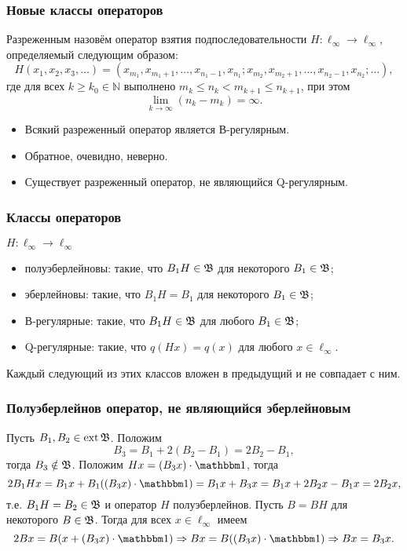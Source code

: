 \begin{frame}\frametitle{{Новые классы операторов}}
	\vfill
	\begin{ddefinition}
		Разреженным назовём оператор
		взятия подпоследовательности
		$H: \ell_\infty \to \ell_\infty$,
		определяемый следующим образом:
		$$
		H(x_1, x_2, x_3, \ldots) = (x_{m_1}, x_{m_1 + 1}, \ldots, x_{n_1 - 1}, x_{n_1};
		x_{m_2}, x_{m_2 + 1}, \ldots, x_{n_2 - 1}, x_{n_2}; \ldots),
		$$
		где для всех
		$k \geqslant k_0 \in \mathbb N$
		выполнено
		$
		m_k \leqslant n_k < m_{k+1}\leqslant n_{k+1}
		$,
		при этом
		$$
		\lim\limits_{k \to \infty} (n_k - m_k) = \infty
		.
		$$

		\begin{itemize}
			\item
				Всякий разреженный оператор является В-регулярным.
			\item
				Обратное, очевидно, неверно.
			\item
				Существует разреженный оператор, не являющийся Q-регулярным.
		\end{itemize}
	\end{ddefinition}
	\vfill
\end{frame}

\begin{frame}\frametitle{{Классы операторов}}
	$H:\ell_\infty \to \ell_\infty$
	\begin{itemize}
		\item
			полуэберлейновы: такие, что $B_1 H \in\mathfrak{B}$ для некоторого $B_1\in \mathfrak{B}$;
		\item
			эберлейновы: такие, что $B_1 H = B_1$ для некоторого $B_1\in \mathfrak{B}$;
		\item
			В-регулярные: такие, что $B_1 H \in \mathfrak{B}$ для любого   $B_1\in \mathfrak{B}$;
		\item
			Q-регулярные: такие, что $q(Hx) = q(x)$ для любого   $x\in \ell_\infty$.
	\end{itemize}
	\begin{ttheorem}
		Каждый следующий из этих классов вложен в предыдущий и не совпадает с ним.
	\end{ttheorem}
\end{frame}


\begin{frame}\frametitle{{Полуэберлейнов оператор, не являющийся эберлейновым}}
	Пусть $B_1, B_2 \in \operatorname{ext} \mathfrak{B}$.
	Положим
	\begin{equation}
		\label{eq:am_not_eber_def}
		B_3 = B_1 + 2(B_2-B_1) = 2B_2-B_1,
	\end{equation}
	тогда $B_3 \notin \mathfrak{B}$.
	Положим $Hx = (B_3 x) \cdot\one$, тогда
	\begin{equation}
		2 B_1 H x = B_1 x + B_1 ((B_3 x) \cdot\one) = B_1 x + B_3 x =
		B_1 x + 2 B_2 x - B_1 x = 2B_2 x
		,
	\end{equation}
	т.е. $B_1 H = B_2 \in \mathfrak{B}$ и оператор $H$ полуэберлейнов.
	Пусть $B = BH$ для некоторого $B\in\mathfrak{B}$.
	Тогда для всех $x\in\ell_\infty$ имеем
	\begin{equation}
		2Bx = B (x + (B_3 x) \cdot \one)
		\Rightarrow
		Bx =  B((B_3 x) \cdot \one)
		\Rightarrow
		Bx = B_3x
		.
	\end{equation}
\end{frame}

